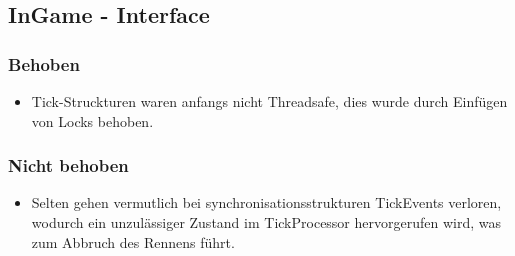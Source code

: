 \subsection{InGame - Interface}
\subsubsection{Behoben}
\begin{itemize}
    \item Tick-Struckturen waren anfangs nicht Threadsafe, dies wurde durch Einfügen von Locks behoben.
\end{itemize}

\subsubsection{Nicht behoben}
\begin{itemize}
    \item Selten gehen vermutlich bei synchronisationsstrukturen TickEvents verloren, wodurch ein unzulässiger Zustand im TickProcessor hervorgerufen wird,
    was zum Abbruch des Rennens führt.
\end{itemize}